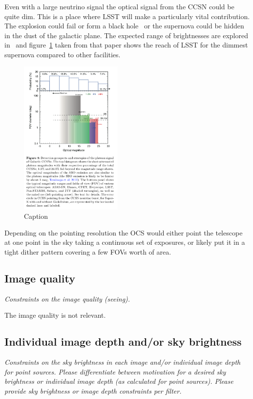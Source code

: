 \documentclass[11pt]{article}
\begin{document}
Even with a large neutrino signal the optical signal from the CCSN
could be quite dim.  This is a place where LSST will make a
particularly vital contribution.  The explosion could fail or form a
black hole~\cite{evanpaper?} or the supernova could be hidden in the
dust of the galactic plane.  The expected range of brightnesses are
explored in~\cite{2016MNRAS.461.3296N} and
figure~\ref{fig:multimessenger-comparison} taken from that paper shows
the reach of LSST for the dimmest supernova compared to other facilities.

\begin{figure}
  \begin{center}
    \includegraphics[width=2.0in]{multimessenger-comparison}
    \caption{Caption}
    \label{fig:multimessenger-comparison}
  \end{center}
\end{figure}

Depending on the pointing resolution the OCS would either point the
telescope at one point in the sky taking a continuous set of
exposures, or likely put it in a tight dither pattern covering a few
FOVs worth of area.

\subsection{Image quality}
\begin{footnotesize}{\it Constraints on the image quality (seeing).}\end{footnotesize}

The image quality is not relevant.

\subsection{Individual image depth and/or sky brightness}
\begin{footnotesize}{\it Constraints on the sky brightness in each image and/or individual image depth for point sources.
Please differentiate between motivation for a desired sky brightness or individual image depth (as 
calculated for point sources). Please provide sky brightness or image depth constraints per filter.}
\end{footnotesize}
\end{document}
